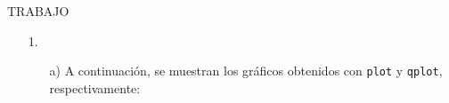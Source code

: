 \documentclass[11pt,a4paper]{article}
\begin{document}


\newpage

\begin{center}
{\large TRABAJO}
\end{center}

\begin{itemize}
\item[1.] 
\begin{itemize}
\item[a)] A continuación, se muestran los gráficos obtenidos con \verb+plot+ y \verb+qplot+, respectivamente:

\begin{figure}[h]
\end{figure}



\end{itemize}
\end{itemize}
\end{document}
